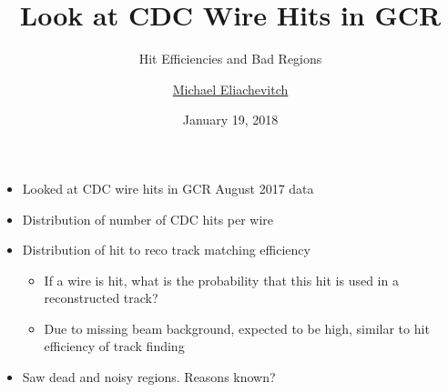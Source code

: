 \documentclass[18pt]{beamer}
\title{Look at CDC Wire Hits in GCR}
\subtitle{Hit Efficiencies and Bad Regions}
\author{\underline{Michael Eliachevitch}}
\date{January 19, 2018}
\institute{ETP -- KIT}
\begin{document}

\begin{frame}
  \titlepage
\end{frame}

\begin{frame}
  \begin{itemize}
  \item Looked at CDC wire hits in GCR August 2017 data
  \item Distribution of number of CDC hits per wire
  \item Distribution of hit to reco track matching efficiency
    \begin{itemize}
    \item If a wire is hit, what is the probability that this hit is used in a reconstructed track?\\
    \item Due to missing beam background, expected to be high, similar to hit efficiency of track finding
    \end{itemize}
  \item Saw dead and noisy regions. Reasons known?
  \end{itemize}
\end{frame}
\end{document}
